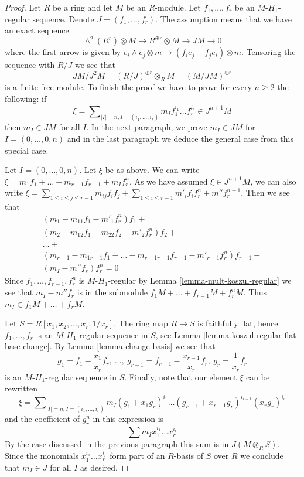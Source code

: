 \begin{proof}
Let $R$ be a ring and let $M$ be an $R$-module.
Let $f_1, \ldots, f_r$ be an $M$-$H_1$-regular sequence.
Denote $J = (f_1, \ldots, f_r)$. The assumption means that we have
an exact sequence
$$
\wedge^2(R^r) \otimes M \to R^{\oplus r} \otimes M \to JM \to 0
$$
where the first arrow is given by
$e_i \wedge e_j \otimes m \mapsto (f_ie_j - f_je_i) \otimes m$.
Tensoring the sequence with $R/J$ we see that
$$
JM/J^2M = (R/J)^{\oplus r} \otimes_R M = (M/JM)^{\oplus r}
$$
is a finite free module. To finish the proof we have to prove
for every $n \geq 2$ the following: if
$$
\xi = \sum\nolimits_{|I| = n, I = (i_1, \ldots, i_r)}
m_I f_1^{i_1} \ldots f_r^{i_r} \in J^{n + 1}M
$$
then $m_I \in JM$ for all $I$. In the next paragraph, we prove
$m_I \in JM$ for $I = (0, \ldots, 0, n)$ and in the last paragraph
we deduce the general case from this special case.

\medskip\noindent
Let $I = (0, \ldots, 0, n)$. Let $\xi$ be as above. We can write
$\xi = m_1 f_1 + \ldots + m_{r - 1}f_{r - 1} + m_I f_r^n$.
As we have assumed $\xi \in J^{n + 1}M$, we can also write
$\xi = \sum_{1 \leq i \leq j \leq r - 1} m_{ij}f_if_j +
\sum_{1 \leq i \leq r - 1}m'_i f_if_r^n + m'' f_r^{n + 1}$.
Then we see that
$$
\begin{matrix}
(m_1 - m_{11}f_1 - m'_1f_r^n)f_1 + \\
(m_2 - m_{12}f_1 - m_{22}f_2 - m'_2f_r^n)f_2 + \\
\ldots + \\
(m_{r - 1} - m_{1 r - 1}f_1 - \ldots - m_{r - 1 r - 1}f_{r - 1}
- m'_{r - 1}f_r^n)f_{r - 1} + \\
(m_I - m'' f_r)f_r^n = 0
\end{matrix}
$$
Since $f_1, \ldots, f_{r - 1}, f_r^n$ is $M$-$H_1$-regular by
Lemma \ref{lemma-mult-koszul-regular} we see that $m_I - m'' f_r$
is in the submodule $f_1M + \ldots + f_{r - 1}M + f_r^nM$.
Thus $m_I \in f_1M + \ldots + f_rM$.

\medskip\noindent
Let $S = R[x_1, x_2, \ldots, x_r, 1/x_r]$. The ring map $R \to S$ is faithfully
flat, hence $f_1, \ldots, f_r$ is an $M$-$H_1$-regular sequence in $S$, see
Lemma \ref{lemma-koszul-regular-flat-base-change}.
By
Lemma \ref{lemma-change-basis}
we see that
$$
g_1 = f_1 - \frac{x_1}{x_r} f_r,
\ \ldots,
\ g_{r - 1} = f_{r - 1} - \frac{x_{r - 1}}{x_r} f_r,
\ g_r = \frac{1}{x_r}f_r
$$
is an $M$-$H_1$-regular sequence in $S$. Finally, note that our element
$\xi$ can be rewritten
$$
\xi = \sum\nolimits_{|I| = n, I = (i_1, \ldots, i_r)}
m_I (g_1 + x_1 g_r)^{i_1} \ldots (g_{r - 1} + x_{r - 1} g_r)^{i_{r - 1}}
(x_rg_r)^{i_r}
$$
and the coefficient of $g_r^n$ in this expression is
$$
\sum m_I x_1^{i_1} \ldots x_r^{i_r}
$$
By the case discussed in the previous paragraph this sum is in
$J(M \otimes_R S)$. Since the monomials $x_1^{i_1} \ldots x_r^{i_r}$
form part of an $R$-basis of $S$ over $R$ we conclude that $m_I \in J$
for all $I$ as desired.
\end{proof}

